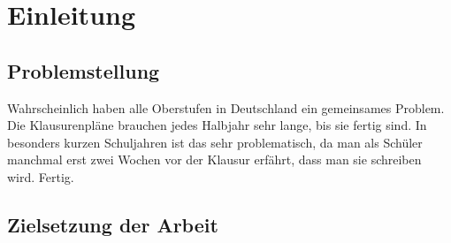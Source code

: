 \newpage
\section{Einleitung}
\subsection{Problemstellung}
Wahrscheinlich haben alle Oberstufen in Deutschland ein gemeinsames Problem. Die Klausurenpläne brauchen jedes Halbjahr sehr lange, bis sie fertig sind. In besonders kurzen Schuljahren ist das sehr problematisch, da man als Schüler manchmal erst zwei Wochen vor der Klausur erfährt, dass man sie schreiben wird. Fertig.
\newpage
\subsection{Zielsetzung der Arbeit}